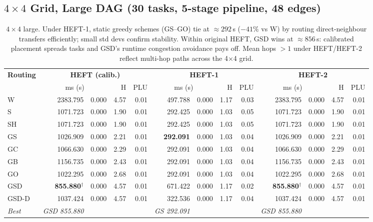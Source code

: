 \documentclass[11pt]{article}
\newcommand{\win}[1]{\textcolor{green!50!black}{\textbf{#1}}}
\newcommand{\bad}[1]{\textcolor{red!70!black}{#1}}
\begin{document}
\subsection{$4\times4$ Grid, Large DAG (30 tasks, 5-stage pipeline, 48 edges)}

\begin{table}[H]
\centering
\small
\setlength{\tabcolsep}{4pt}
\begin{tabular}{l r@{$\,\pm\,$}l r r r@{$\,\pm\,$}l r r r@{$\,\pm\,$}l r r}
\toprule
\textbf{Routing} & \multicolumn{4}{c}{\textbf{HEFT (calib.)}} & \multicolumn{4}{c}{\textbf{HEFT-1}} & \multicolumn{4}{c}{\textbf{HEFT-2}} \\
\cmidrule(lr){2-5}\cmidrule(lr){6-9}\cmidrule(lr){10-13}
 & \multicolumn{2}{c}{ms (s)} & H & PLU & \multicolumn{2}{c}{ms (s)} & H & PLU & \multicolumn{2}{c}{ms (s)} & H & PLU \\
\midrule
W & \bad{2383.795} & 0.000 & 4.57 & 0.01 & 497.788 & 0.000 & 1.17 & 0.03 & \bad{2383.795} & 0.000 & 4.57 & 0.01 \\
S & 1071.723 & 0.000 & 1.90 & 0.01 & 292.425 & 0.000 & 1.03 & 0.05 & 1071.723 & 0.000 & 1.90 & 0.01 \\
SH & 1071.723 & 0.000 & 1.90 & 0.01 & 292.425 & 0.000 & 1.03 & 0.05 & 1071.723 & 0.000 & 1.90 & 0.01 \\
GS & 1026.909 & 0.000 & 2.21 & 0.01 & \win{292.091} & 0.000 & 1.03 & 0.04 & 1026.909 & 0.000 & 2.21 & 0.01 \\
GC & 1066.630 & 0.000 & 2.29 & 0.01 & 292.091 & 0.000 & 1.03 & 0.04 & 1066.630 & 0.000 & 2.29 & 0.01 \\
GB & 1156.735 & 0.000 & 2.43 & 0.01 & 292.091 & 0.000 & 1.03 & 0.04 & 1156.735 & 0.000 & 2.43 & 0.01 \\
GO & 1022.295 & 0.000 & 2.68 & 0.01 & 292.091 & 0.000 & 1.03 & 0.04 & 1022.295 & 0.000 & 2.68 & 0.01 \\
GSD & \textbf{855.880}$^\dagger$ & 0.000 & 4.57 & 0.01 & \bad{671.422} & 0.000 & 1.17 & 0.02 & \textbf{855.880}$^\dagger$ & 0.000 & 4.57 & 0.01 \\
GSD\mbox{-}D & 1037.424 & 0.000 & 4.57 & 0.01 & 322.536 & 0.000 & 1.17 & 0.04 & 1037.424 & 0.000 & 4.57 & 0.01 \\
\midrule
\textit{Best} & \textit{GSD 855.880} &  &  &  & \textit{GS 292.091} &  &  &  & \textit{GSD 855.880} &  &  &  \\
\bottomrule
\end{tabular}
\caption{$4\times4$ large. Under HEFT-1, static greedy schemes (GS--GO) tie at $\approx292$\,s ($-41\%$ vs W) by routing direct-neighbour transfers efficiently; small std devs confirm stability. Within original HEFT, GSD wins at $\approx856$\,s: calibrated placement spreads tasks and GSD's runtime congestion avoidance pays off. Mean hops $>1$ under HEFT/HEFT-2 reflect multi-hop paths across the 4$\times$4 grid.}
\end{table}
\end{document}
